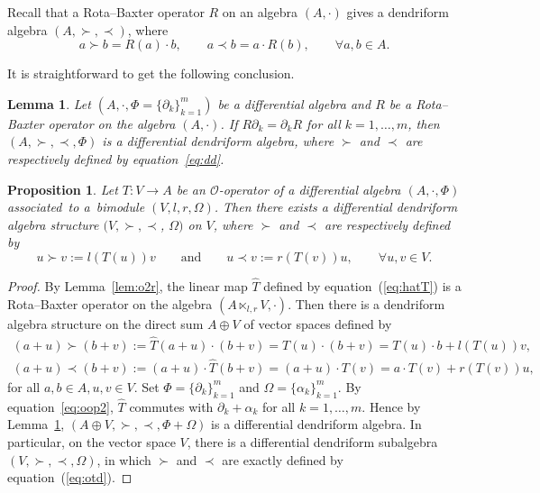 \documentclass[pdftex]{sigma}
\numberwithin{equation}{section}
\newtheorem{Lemma}[Theorem]{Lemma}
\newtheorem{Proposition}[Theorem]{Proposition}
{ \theoremstyle{definition}
	\newtheorem{Definition}[Theorem]{Definition}
	\newtheorem{Note}[Theorem]{Note}
	\newtheorem{Example}[Theorem]{Example}
	\newtheorem{Remark}[Theorem]{Remark} }
\begin{document}
Recall \cite{aguiar2000pre,bai2013splitting} that a Rota--Baxter operator $R$ on an algebra $(A,\cdot)$ gives a dendriform algebra $(A,\succ,\prec)$, where
\begin{equation}
	a \succ b = R(a) \cdot b, \qquad a\prec b = a\cdot R(b), \qquad \forall a, b \in A. \label{eq:dd}
\end{equation}

It is straightforward to get the following conclusion.
\begin{Lemma}\label{lem:ff}
Let $(A, \cdot, \Phi = \{\partial_k\}_{k=1}^m)$ be a differential
algebra and $R$ be a Rota--Baxter operator on the algebra
$(A,\cdot)$. If $R\partial_k=\partial_kR$ for all $k=1,\dots, m$, then
$(A,\succ,\prec, \Phi)$ is a differential dendriform algebra,
where $\succ$ and $\prec$ are respectively defined by equation~\eqref{eq:dd}.
\end{Lemma}

\begin{Proposition}\label{pro:opd} Let $T\colon V \to A$ be an $\mathcal{O}$-operator of a differential algebra $(A, \cdot, \Phi)$ associated~to a~bimodule $(V, l, r, \Omega)$.
 Then there exists a differential dendriform algebra structure $(V, \succ, \prec$, $\Omega)$ on $V$,
 where $\succ$ and $\prec$ are respectively defined by
 \begin{equation}
 u \succ v := l(T(u)) v \qquad \text{and} \qquad
 u \prec v := r(T(v)) u, \qquad
 \forall u, v \in V. \label{eq:otd}
 \end{equation}
\end{Proposition}
\begin{proof}
	By Lemma~\ref{lem:o2r}, the linear map $\hat T$ defined by equation~(\ref{eq:hatT}) is a Rota--Baxter operator on the algebra $(A \ltimes_{l, r} V, \cdot)$.
	Then there is a dendriform algebra structure on the direct sum $A\oplus V$ of vector spaces defined by
	\begin{gather*}
		(a+u) \succ (b+v) :=\hat T(a+u) \cdot (b+v)=T(u)\cdot (b+v)=T(u)\cdot b+l(T(u)) v, \\
		(a+u) \prec (b+v) := (a+u) \cdot \hat T(b+v)=(a+u)\cdot T(v)=a\cdot T(v)+ r(T(v)) u,
	\end{gather*}
	for all $a, b \in A, u, v \in V$.
	Set $\Phi = \{\partial_k\}_{k=1}^m$ and $\Omega = \{\alpha_k\}_{k=1}^m$.
	By equation~\eqref{eq:oop2}, $\hat T$ commutes with $\partial_k + \alpha_k$ for all $k=1, \dots, m$.
	Hence by Lemma~\ref{lem:ff}, $(A\oplus V, \succ, \prec, \Phi + \Omega)$ is a differential dendriform algebra.
	In particular, on the vector space $V$, there is a differential dendriform subalgebra $(V,\succ,\prec, \Omega)$,
	in which $\succ$ and $\prec$ are exactly defined by equation~(\ref{eq:otd}).
\end{proof}
\end{document}
